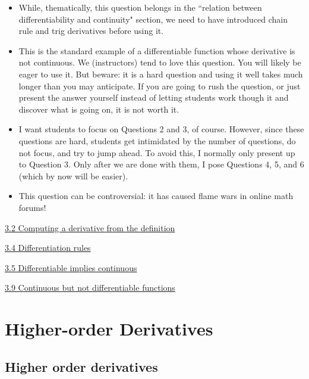 \documentclass[11pt]{article}
\newcommand{\nl}{\hfill \vspace{-1.1\baselineskip}} %
\newcommand{\vii}{\hspace{8mm} \href{https://www.youtube.com/watch?v=eNcg9cKzV1Q&list=PLlwePzQY_wW8qiZD6XYqCnibdY37ygbx7&index=2}{3.2 Computing a derivative from the definition}}
\newcommand{\viv}{\hspace{8mm} \href{https://www.youtube.com/watch?v=k_VxtK1U9jk&list=PLlwePzQY_wW8qiZD6XYqCnibdY37ygbx7&index=4}{3.4 Differentiation rules}}
\newcommand{\vv}{\hspace{8mm} \href{https://www.youtube.com/watch?v=QQbiHHiqTXo&list=PLlwePzQY_wW8qiZD6XYqCnibdY37ygbx7&index=5}{3.5 Differentiable implies continuous}}
\newcommand{\vix}{\hspace{8mm} \href{https://www.youtube.com/watch?v=QBmUyi64zf8&list=PLlwePzQY_wW8qiZD6XYqCnibdY37ygbx7&index=9}{3.9 Continuous but not differentiable functions}}
\begin{document}
\begin{warning}
\nl
	\begin{itemize}
		\item While, thematically, this question belongs in the ``relation between differentiability and continuity" section, we need to have introduced chain rule and trig derivatives before using it.
		\item  This is the standard example of a differentiable function whose derivative is not continuous.  We (instructors) tend to love this question.  You will likely be eager to use it.  But beware: it is a hard question and using it well takes much longer than you may anticipate.  If you are going to rush the question, or just present the answer yourself instead of letting students work though it and discover what is going on, it is not worth it.
	\end{itemize}
\end{warning}

\begin{comments}
\nl
	\begin{itemize}
		\item  I want students to focus on Questions 2 and 3, of course.  However, since these questions are hard, students get intimidated by the number of questions, do not focus, and try to jump ahead.  To avoid this, I normally only present up to Question 3.  Only after we are done with them, I pose Questions 4, 5, and 6 (which by now will be easier).
		\item This question can be controversial: it has caused flame wars in online math forums!
	\end{itemize}
\end{comments}

\begin{videos}
\vii

\viv

\vv

\vix
\end{videos}

\newpage

\section{Higher-order Derivatives}

\subsection{Higher order derivatives} 
\end{document}
